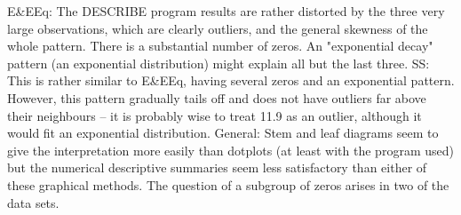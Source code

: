 \documentclass[a4paper,12pt]{article}
\begin{document}
\begin{enumerate}
E&EEq: The DESCRIBE program results are rather distorted by the three very large
observations, which are clearly outliers, and the general skewness of the whole
pattern. There is a substantial number of zeros. An "exponential decay" pattern (an
exponential distribution) might explain all but the last three.
SS: This is rather similar to E&EEq, having several zeros and an exponential pattern.
However, this pattern gradually tails off and does not have outliers far above their
neighbours – it is probably wise to treat 11.9 as an outlier, although it would fit an
exponential distribution.
General: Stem and leaf diagrams seem to give the interpretation more easily than
dotplots (at least with the program used) but the numerical descriptive summaries
seem less satisfactory than either of these graphical methods. The question of a subgroup
of zeros arises in two of the data sets.
\end{enumerate}
\end{document}
